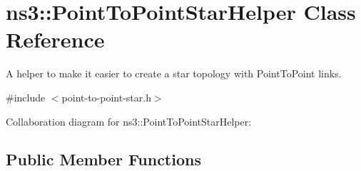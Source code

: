 \hypertarget{classns3_1_1PointToPointStarHelper}{}\section{ns3\+:\+:Point\+To\+Point\+Star\+Helper Class Reference}
\label{classns3_1_1PointToPointStarHelper}


A helper to make it easier to create a star topology with Point\+To\+Point links.  




{\ttfamily \#include $<$point-\/to-\/point-\/star.\+h$>$}



Collaboration diagram for ns3\+:\+:Point\+To\+Point\+Star\+Helper\+:
\subsection*{Public Member Functions}
